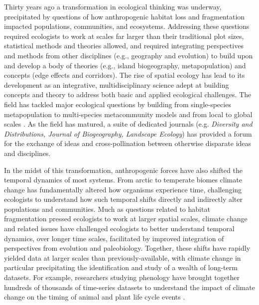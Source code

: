 \documentclass[11pt,a4paper,oneside]{article}
\begin{document}
\newpage
\linenumbers

Thirty years ago a transformation in ecological thinking was underway, precipitated by questions of how anthropogenic habitat loss and fragmentation impacted populations, communities, and ecosystems. Addressing these questions required ecologists to work at scales far larger than their traditional plot sizes, statistical methods and theories allowed, and required integrating perspectives and methods from other disciplines (e.g., geography and evolution) to build upon and develop a body of theories (e.g., island biogeography, metapopulation) and concepts (edge effects and corridors). The rise of spatial ecology has lead to its development as an integrative, multidisciplinary science adept at building concepts and theory to address both basic and applied ecological challenges. The field has tackled major ecological questions by building from single-species metapopulation to multi-species metacommunity models \citep{Pillai2011} and from local to global scales \citep{bell2001}. As the field has matured, a suite of dedicated journals  (e.g. \emph{Diversity and Distributions, Journal of Biogeography, Landscape Ecology}) has provided a forum for the exchange of ideas and cross-pollination between otherwise disparate ideas and disciplines. %

In the midst of this transformation, anthropogenic forces have also shifted the temporal dynamics of most systems. From arctic to temperate biomes climate change has fundamentally altered how organisms experience time, challenging ecologists to understand how such temporal shifts directly and indirectly alter populations and communities. Much as questions related to habitat fragmentation pressed ecologists to work at larger spatial scales, climate change and related issues have challenged ecologists to better understand temporal dynamics, over longer time scales, facilitated by improved integration of perspectives from evolution and paleobiology. Together, these shifts have rapidly yielded data at larger scales than previously-available, with climate change in particular precipitating the identification and study of a wealth of long-term datasets. For example, researchers studying phenology have brought together hundreds of thousands of time-series datasets to understand the impact of climate change on the timing of animal and plant life cycle events \citep{Menzel:2006sq}.
\end{document}
